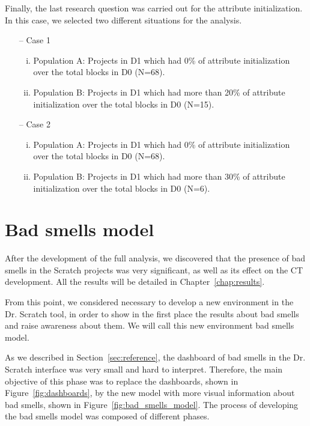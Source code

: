 Finally, the last research question was carried out for the attribute initialization. In this case, we selected two different situations for the analysis. 

\begin{itemize}
    \item[--] Case 1
    \begin{enumerate}[(i)]
        \item Population A: Projects in D1 which had 0\% of attribute initialization over the total blocks in D0 (N=68).
        \item Population B: Projects in D1 which had more than 20\% of attribute initialization over the total blocks in D0 (N=15).
    \end{enumerate}
    \item[--] Case 2
    \begin{enumerate}[(i)]
        \item Population A: Projects in D1 which had 0\% of attribute initialization over the total blocks in D0 (N=68).
        \item Population B: Projects in D1 which had more than 30\% of attribute initialization over the total blocks in D0 (N=6).
    \end{enumerate}
\end{itemize}


\section{Bad smells model}
\label{sec:badsmells}

After the development of the full analysis, we discovered that the presence of bad smells in the Scratch projects was very significant, as well as its effect on the CT development. All the results will be detailed in Chapter~\ref{chap:results}. 

From this point, we considered necessary to develop a new environment in the Dr. Scratch tool, in order to show in the first place the results about bad smells and raise awareness about them. We will call this new environment bad smells model. 

As we described in Section~\ref{sec:reference}, the dashboard of bad smells in the Dr. Scratch interface was very small and hard to interpret. Therefore, the main objective of this phase was to replace the dashboards, shown in Figure~\ref{fig:dashboards}, by the new model with more visual information about bad smells, shown in Figure~\ref{fig:bad_smells_model}. The process of developing the bad smells model was composed of different phases.

